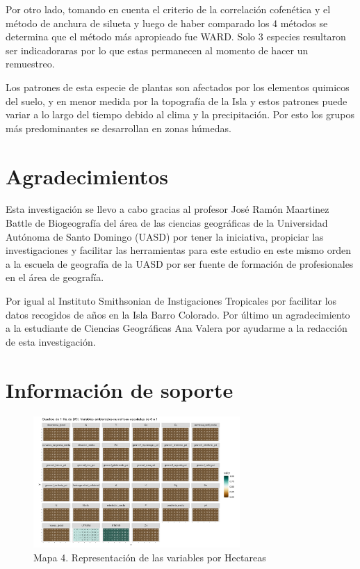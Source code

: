\documentclass[11pt,]{article}
\begin{document}
Por otro lado, tomando en cuenta el criterio de la correlación
cofenética y el método de anchura de silueta y luego de haber comparado
los 4 métodos se determina que el método más apropieado fue WARD. Solo 3
especies resultaron ser indicadoraras por lo que estas permanecen al
momento de hacer un remuestreo.

Los patrones de esta especie de plantas son afectados por los elementos
quimicos del suelo, y en menor medida por la topografía de la Isla y
estos patrones puede variar a lo largo del tiempo debido al clima y la
precipitación. Por esto los grupos más predominantes se desarrollan en
zonas húmedas.

\section{Agradecimientos}\label{agradecimientos}

Esta investigación se llevo a cabo gracias al profesor José Ramón
Maartinez Battle de Biogeografía del área de las ciencias geográficas de
la Universidad Autónoma de Santo Domingo (UASD) por tener la iniciativa,
propiciar las investigaciones y facilitar las herramientas para este
estudio en este mismo orden a la escuela de geografía de la UASD por ser
fuente de formación de profesionales en el área de geografía.

Por igual al Instituto Smithsonian de Instigaciones Tropicales por
facilitar los datos recogidos de años en la Isla Barro Colorado. Por
último un agradecimiento a la estudiante de Ciencias Geográficas Ana
Valera por ayudarme a la redacción de esta investigación.

\section{Información de soporte}\label{informaciuxf3n-de-soporte}

\begin{figure}
\centering
\includegraphics[width=0.70000\textwidth]{mapas_variables_ambientales_numericas.png}
\caption{Mapa 4. Representación de las variables por Hectareas}
\end{figure}
\end{document}
